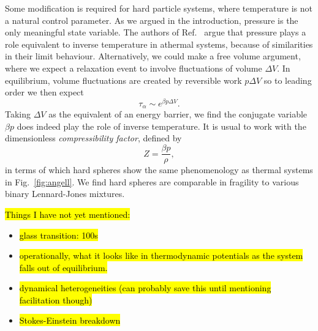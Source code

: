 Some modification is required for hard particle systems, where temperature is not a natural control parameter.
As we argued in the introduction, pressure is the only meaningful state variable.
The authors of Ref.\ \cite{BerthierPRE2009} argue that pressure plays a role equivalent to inverse temperature in athermal systems, because of similarities in their limit behaviour.
Alternatively, we could make a free volume argument, where we expect a relaxation event to involve fluctuations of volume $\Delta V$.
In equilibrium, volume fluctuations are created by reversible work $p \Delta V$ so to leading order%
we then expect
\begin{equation*}
  \tau_\alpha \sim e^{\beta p \Delta V}.
\end{equation*}
Taking $\Delta V$ as the equivalent of an energy barrier, we find the conjugate variable $\beta p$ does indeed play the role of inverse temperature.
It is usual to work with the dimensionless \emph{compressibility factor}, defined by
\begin{equation}
  Z = \frac{\beta p}{\rho},
\end{equation}
in terms of which hard spheres show the same phenomenology as thermal systems in Fig.\ \ref{fig:angell}.
We find hard spheres are comparable in fragility to various binary Lennard-Jones mixtures.

\hl{Things I have not yet mentioned:}
\begin{itemize}
\item \hl{glass transition: 100s}
\item \hl{operationally, what it looks like in thermodynamic potentials as the system falls out of equilibrium.}
\item \hl{dynamical heterogeneities (can probably save this until mentioning facilitation though)}
\item \hl{Stokes-Einstein breakdown}
\end{itemize}


